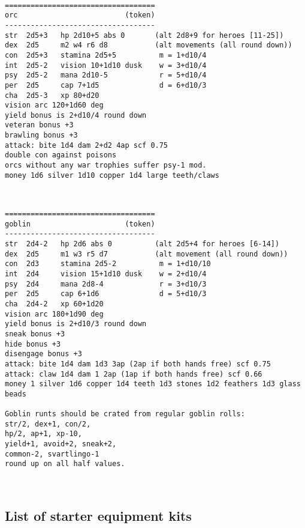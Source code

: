 \

\pagebreak[1] \begin{samepage} \begin{verbatim}
===================================
orc                         (token)
-----------------------------------
str  2d5+3   hp 2d10+5 abs 0       (alt 2d8+9 for heroes [11-25])
dex  2d5     m2 w4 r6 d8           (alt movements (all round down))
con  2d5+3   stamina 2d5+5          m = 1+d10/4
int  2d5-2   vision 10+1d10 dusk    w = 3+d10/4
psy  2d5-2   mana 2d10-5            r = 5+d10/4
per  2d5     cap 7+1d5              d = 6+d10/3
cha  2d5-3   xp 80+d20
vision arc 120+1d60 deg
yield bonus is 2+d10/4 round down
veteran bonus +3
brawling bonus +3
attack: bite 1d4 dam 2+d2 4ap scf 0.75
double con against poisons
orcs without any war trophies suffer psy-1 mod.
money 1d6 silver 1d10 copper 1d4 large teeth/claws
\end{verbatim} \end{samepage}

\

\pagebreak[1] \begin{samepage} \begin{verbatim}
===================================
goblin                      (token)
-----------------------------------
str  2d4-2   hp 2d6 abs 0          (alt 2d5+4 for heroes [6-14])
dex  2d5     m1 w3 r5 d7           (alt movement (all round down))
con  2d3     stamina 2d5-2          m = 1+d10/10
int  2d4     vision 15+1d10 dusk    w = 2+d10/4
psy  2d4     mana 2d8-4             r = 3+d10/3
per  2d5     cap 6+1d6              d = 5+d10/3
cha  2d4-2   xp 60+1d20
vision arc 180+1d90 deg
yield bonus is 2+d10/3 round down
sneak bonus +3
hide bonus +3
disengage bonus +3
attack: bite 1d4 dam 1d3 3ap (2ap if both hands free) scf 0.75
attack: claw 1d4 dam 1 2ap (1ap if both hands free) scf 0.66
money 1 silver 1d6 copper 1d4 teeth 1d3 stones 1d2 feathers 1d3 glass beads

Goblin runts should be crated from regular goblin rolls:
str/2, dex+1, con/2,
hp/2, ap+1, xp-10,
yield+1, avoid+2, sneak+2,
common-2, svartlingo-1
round up on all half values.
\end{verbatim} \end{samepage}

\normalsize

\



\subsection*{List of starter equipment kits}

